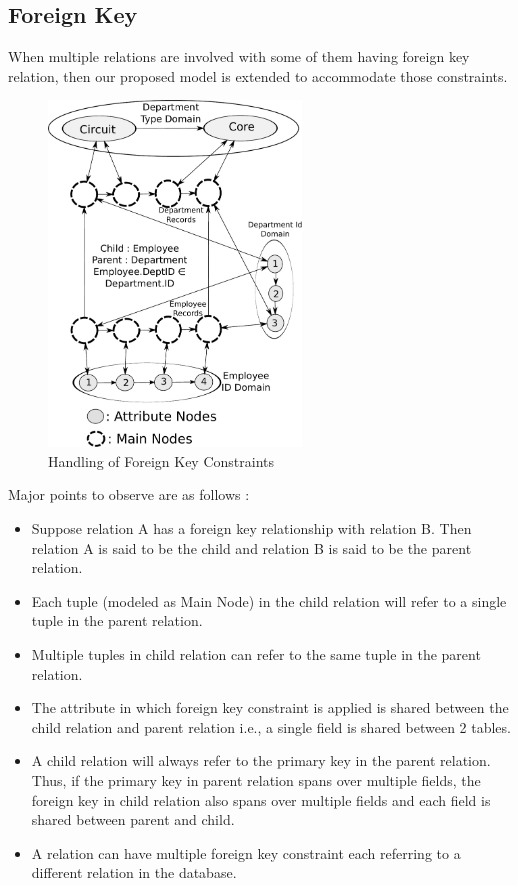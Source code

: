 \documentclass[12pt, oneside]{book}
\begin{document}
\subsection{Foreign Key}
When multiple relations are involved with some of them having foreign key relation, then our proposed model is extended to accommodate those constraints.
\begin{figure}[h]
 \centering
 \includegraphics[width=0.6\textwidth]{pics/foreign_key.pdf}
 \caption{Handling of Foreign Key Constraints}
 \label{fig:foreign_key}
\end{figure}
Major points to observe are as follows :
\begin{itemize}
 \item Suppose relation A has a foreign key relationship with relation B. Then relation A is said to be the child and relation B is said to be the parent relation.
 \item Each tuple (modeled as Main Node) in the child relation will refer to a single tuple in the parent relation.
 \item Multiple tuples in child relation can refer to the same tuple in the parent relation.
 \item The attribute in which foreign key constraint is applied is shared between the child relation and parent relation i.e., a single field is shared between 2
 tables.
 \item A child relation will always refer to the primary key in the parent relation. Thus, if the primary key in parent relation spans over multiple fields, the foreign key in child relation also spans over multiple fields and each field is shared between parent and child.
 \item A relation can have multiple foreign key constraint each referring to a different relation in the database.
\end{itemize}
\end{document}
